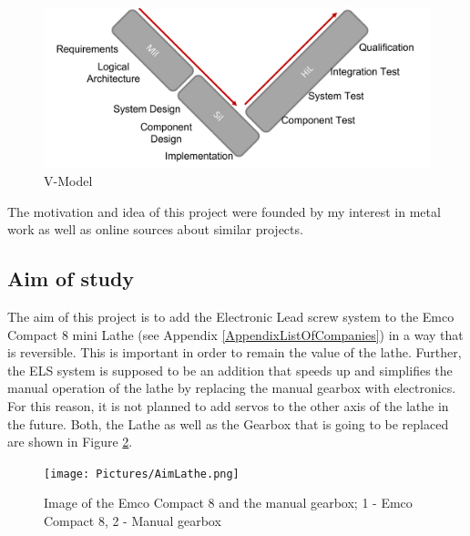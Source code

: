 \begin{figure}
    \begin{center}
    \includegraphics[width=12cm]{Pictures/VModelComplete.png}
    \caption[V-Model Complete]{V-Model}
    \label{V-Model Complete}
    \end{center}
\end{figure}
 
The motivation and idea of this project were founded by my interest in metal work as well as online sources about similar projects.\cite{CloughELS}
 
\subsection{Aim of study}
The aim of this project is to add the Electronic Lead screw system to the Emco Compact 8 mini Lathe (see Appendix \ref{AppendixListOfCompanies}) in a way that is reversible. This is important in order to remain the value of the lathe. Further, the ELS system is supposed to be an addition that speeds up and simplifies the manual operation of the lathe by replacing the manual gearbox with electronics. For this reason, it is not planned to add servos to the other axis of the lathe in the future. Both, the Lathe as well as the Gearbox that is going to be replaced are shown in Figure \ref{AimLathe}.
 
 

\begin{figure}
    \begin{center}
    \texttt{[image: Pictures/AimLathe.png]}
    \caption[Image of the Emco Compact 8 and the manual gearbox]{Image of the Emco Compact 8 and the manual gearbox; 1 - Emco Compact 8, 2 - Manual gearbox}
    \label{AimLathe}
    \end{center}
\end{figure}



